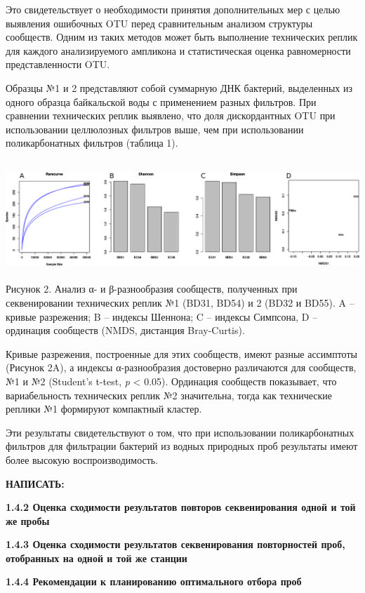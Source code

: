 \documentclass[a4paper,12pt,openany,final]{extreport}
\begin{document}
Это свидетельствует о необходимости принятия дополнительных мер с целью
выявления ошибочных OTU перед сравнительным анализом структуры
сообществ. Одним из таких методов может быть выполнение технических
реплик для каждого анализируемого ампликона и статистическая оценка
равномерности представленности OTU.

Образцы №1 и 2 представляют собой суммарную ДНК бактерий, выделенных из
одного образца байкальской воды с применением разных фильтров. При
сравнении технических реплик выявлено, что доля дискордантных OTU при
использовании целлюлозных фильтров выше, чем при использовании
поликарбонатных фильтров (таблица 1).

\includegraphics[width=6.69236in,height=1.76944in]{media/image6.png}Рисунок
2. Анализ α- и β-разнообразия сообществ, полученных при секвенировании
технических реплик №1 (BD31, BD54) и 2 (BD32 и BD55). A -- кривые
разрежения; B -- индексы Шеннона; C -- индексы Симпсона, D -- ординация
сообществ (NMDS, дистанция Bray-Curtis).

Кривые разрежения, построенные для этих сообществ, имеют разные
ассимптоты (Рисунок 2A), а индексы α-разнообразия достоверно различаются
для сообществ, №1 и №2 (Student's t-test, \emph{p} \textless{} 0.05).
Ординация сообществ показывает, что вариабельность технических реплик №2
значительна, тогда как технические реплики №1 формируют компактный
кластер.

Эти результаты свидетельствуют о том, что при использовании
поликарбонатных фильтров для фильтрации бактерий из водных природных
проб результаты имеют более высокую воспроизводимость.

\textbf{НАПИСАТЬ:}

\textbf{1.4.2 Оценка сходимости результатов повторов секвенирования
одной и той же пробы }

\textbf{1.4.3 Оценка сходимости результатов секвенирования повторностей
проб, отобранных на одной и той же станции}

\textbf{1.4.4 Рекомендации к планированию оптимального отбора проб}
\end{document}
